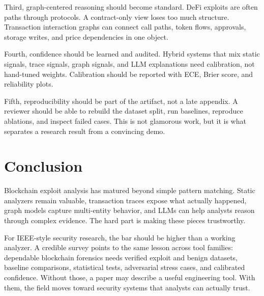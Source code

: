 \documentclass[conference]{IEEEtran}
\begin{document}
Third, graph-centered reasoning should become standard. DeFi exploits are often paths through protocols. A contract-only view loses too much structure. Transaction interaction graphs can connect call paths, token flows, approvals, storage writes, and price dependencies in one object.

Fourth, confidence should be learned and audited. Hybrid systems that mix static signals, trace signals, graph signals, and LLM explanations need calibration, not hand-tuned weights. Calibration should be reported with ECE, Brier score, and reliability plots.

Fifth, reproducibility should be part of the artifact, not a late appendix. A reviewer should be able to rebuild the dataset split, run baselines, reproduce ablations, and inspect failed cases. This is not glamorous work, but it is what separates a research result from a convincing demo.

\section{Conclusion}

Blockchain exploit analysis has matured beyond simple pattern matching. Static analyzers remain valuable, transaction traces expose what actually happened, graph models capture multi-entity behavior, and LLMs can help analysts reason through complex evidence. The hard part is making these pieces trustworthy.

For IEEE-style security research, the bar should be higher than a working analyzer. A credible survey points to the same lesson across tool families: dependable blockchain forensics needs verified exploit and benign datasets, baseline comparisons, statistical tests, adversarial stress cases, and calibrated confidence. Without those, a paper may describe a useful engineering tool. With them, the field moves toward security systems that analysts can actually trust.
\end{document}
